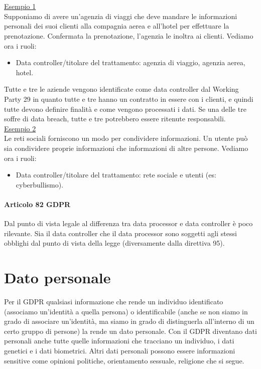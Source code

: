 \noindent \\\\\underline{Esempio 1}
\\

\noindent Supponiamo di avere un'agenzia di viaggi che deve mandare le informazioni personali dei suoi clienti alla compagnia aerea e all'hotel per effettuare la prenotazione. Confermata la prenotazione, l'agenzia le inoltra ai clienti. Vediamo ora i ruoli:
\begin{itemize}
    \item Data controller/titolare del trattamento: agenzia di viaggio, agenzia aerea, hotel.
\end{itemize}

\noindent Tutte e tre le aziende vengono identificate come data controller dal Working Party 29 in quanto tutte e tre hanno un contratto in essere con i clienti, e quindi tutte devono definire finalità e come vengono processati i dati. Se una delle tre soffre di data breach, tutte e tre potrebbero essere ritenute responsabili.
\\

\noindent \underline{Esempio 2}
\\

\noindent Le reti sociali forniscono un modo per condividere informazioni. Un utente può sia condividere proprie informazioni che informazioni di altre persone. Vediamo ora i ruoli:
\begin{itemize}
    \item Data controller/titolare del trattamento: rete sociale e utenti (es: cyberbullismo).
\end{itemize}
   
\paragraph{Articolo 82 GDPR} Dal punto di vista legale al differenza tra data processor e data controller è poco rilevante. Sia il data controller che il data processor sono soggetti agli stessi obblighi dal punto di vista della legge (diversamente dalla direttiva 95).

\section{Dato personale}
Per il GDPR qualsiasi informazione che rende un individuo identificato (associamo un'identità a quella persona) o identificabile (anche se non siamo in grado di associare un'identità, ma siamo in grado di distinguerla all'interno di un certo gruppo di persone) la rende un dato personale. Con il GDPR diventano dati personali anche tutte quelle informazioni che tracciano un individuo, i dati genetici e i dati biometrici. Altri dati personali possono essere informazioni sensitive come opinioni politiche, orientamento sessuale, religione che si segue. 
\\

